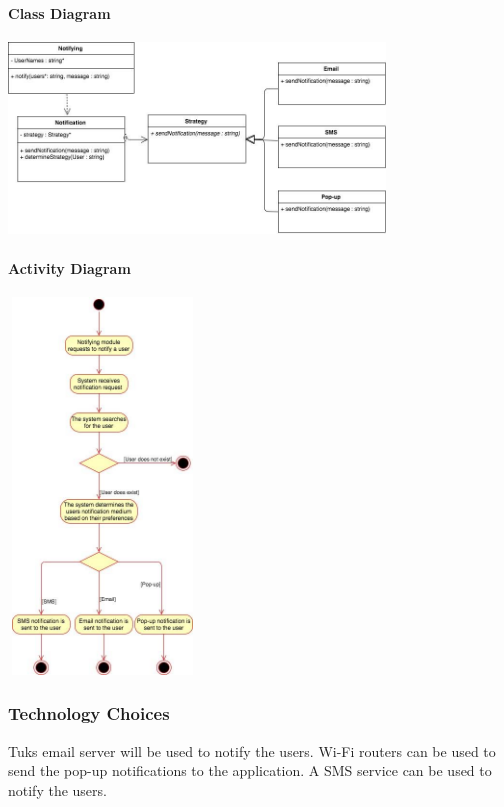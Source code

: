 \documentclass[runningheads,a4paper]{article}
\begin{document}
\paragraph{Class Diagram}
\begin{center}
\includegraphics[width=10cm]{ClassDiagram.png}\\
\end{center}
\paragraph{Activity Diagram}
\begin{center}
\includegraphics[height=10cm,width=5cm]{ActivityDiagram.png} 
\end{center}



\subsubsection{Technology Choices}
Tuks email server will be used to notify the users.
Wi-Fi routers can be used to send the pop-up notifications to the application.
A SMS service can be used to notify the users.
\end{document}
